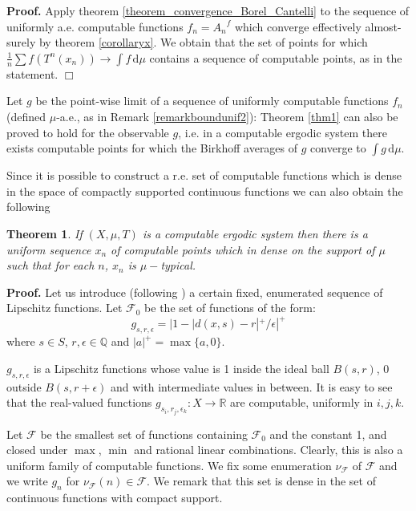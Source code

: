 \documentclass[copyright,creativecommons]{eptcs}
\newtheorem{theorem}{Theorem}
\numberwithin{equation}{section}
\begin{document}
{\bf Proof.}
Apply theorem \ref{theorem_convergence_Borel_Cantelli} to the sequence of
uniformly a.e. computable functions $f_{n}={A_n}^f$ which
converge effectively almost-surely by theorem \ref{corollaryx}. We obtain
that the set of points for which $\frac{1}{n}\sum f(T^{n}(x_{n}))\rightarrow
\int \!{f}\,\mathrm{d}{\mu }$ contains a sequence of computable points, as
in the statement.
$\Box $

Let $g$ be the point-wise limit of a sequence of uniformly computable
functions $f_{n}$ (defined $\mu $-a.e., as in Remark \ref{remarkboundunif2}): Theorem \ref{thm1} can also be proved to hold for the observable $g$,
i.e. in a computable ergodic system there exists computable points for which
the Birkhoff averages of $g$ converge to $\int \!{g}\,\mathrm{d}{\mu }$.

Since it is possible to construct a r.e. set of computable functions which
is dense in the space of compactly supported continuous functions we can
also obtain the following

\begin{theorem}
If $(X,\mu ,T)$ is a computable ergodic system then there is a uniform
sequence $x_{n}$ of computable points which in dense on the support of $\mu $
such that for each $n$, $x_{n}$ is $\mu -$typical.
\end{theorem}

{\bf Proof.}
Let us introduce (following \cite{Gac05}) a certain fixed, enumerated
sequence of Lipschitz functions. Let $\mathcal{F}_{0}$ be the set of
functions of the form:
\begin{equation}
g_{s,r,\epsilon }=|1-|d(x,s)-r|^{+}/\epsilon |^{+}  \label{lip functions}
\end{equation}where $s\in S$, $r,\epsilon \in \mathbb{Q}$ and $|a|^{+}=\max \{a,0\}$.

$g_{s,r,\epsilon }$ is a Lipschitz functions whose value is 1 inside the
ideal ball $B(s,r)$, 0 outside $B(s,r+\epsilon )$ and with intermediate
values in between. It is easy to see that the real-valued functions $g_{s_{i},r_{j},\epsilon _{k}}:X\rightarrow \mathbb{R}$ are computable,
uniformly in $i,j,k$.

Let $\mathcal{F}$ be the smallest set of functions containing $\mathcal{F}_{0}$ and the constant 1, and closed under $\max $, $\min $ and rational
linear combinations. Clearly, this is also a uniform family of computable
functions. We fix some enumeration $\nu _{\mathcal{F}}$ of $\mathcal{F}$ and
we write $g_{n}$ for $\nu _{\mathcal{F}}(n)\in \mathcal{F}$. We remark that
this set is dense in the set of continuous functions with compact support.
\end{document}
